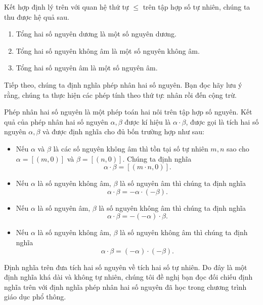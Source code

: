Kết hợp định lý trên với quan hệ thứ tự $\leq$ trên tập hợp số tự nhiên, chúng ta thu được hệ quả sau.

\begin{corollary}\label{corollary:positivity-negativity-nonnegativity-of-sum-of-integers}
	\begin{enumerate}[label={(\roman*)}]
		\item Tổng hai số nguyên dương là một số nguyên dương.
		\item Tổng hai số nguyên không âm là một số nguyên không âm.
		\item Tổng hai số nguyên âm là một số nguyên âm.
	\end{enumerate}
\end{corollary}

Tiếp theo, chúng ta định nghĩa phép nhân hai số nguyên. Bạn đọc hãy lưu ý rằng, chúng ta thực hiện các phép tính theo thứ tự: nhân rồi đến cộng trừ.
\begin{definition}
	Phép nhân hai số nguyên là một phép toán hai nôi trên tập hợp số nguyên. Kết quả của phép nhân hai số nguyên $\alpha, \beta$ được kí hiệu là $\alpha\cdot\beta$, được gọi là tích hai số nguyên $\alpha, \beta$ và được định nghĩa cho đủ bốn trường hợp như sau:
	\begin{itemize}[itemsep=0pt]
		\item Nếu $\alpha$ và $\beta$ là các số nguyên không âm thì tồn tại số tự nhiên $m, n$ sao cho $\alpha = [(m, 0)]$ và $\beta = [(n, 0)]$. Chúng ta định nghĩa
		      \[
			      \alpha\cdot\beta = [(m\cdot n, 0)].
		      \]
		\item Nếu $\alpha$ là số nguyên không âm, $\beta$ là số nguyên âm thì chúng ta định nghĩa
		      \[
			      \alpha\cdot\beta = -\alpha\cdot(-\beta).
		      \]
		\item Nếu $\alpha$ là số nguyên âm, $\beta$ là số nguyên không âm thì chúng ta định nghĩa
		      \[
			      \alpha\cdot\beta = -(-\alpha)\cdot \beta.
		      \]
		\item Nếu $\alpha$ là số nguyên không âm, $\beta$ là số nguyên không âm thì chúng ta định nghĩa
		      \[
			      \alpha\cdot\beta = (-\alpha)\cdot(-\beta).
		      \]
	\end{itemize}
\end{definition}

Định nghĩa trên đưa tích hai số nguyên về tích hai số tự nhiên. Do đây là một định nghĩa khá dài và không tự nhiên, chúng tôi đề nghị bạn đọc đối chiếu định nghĩa trên với định nghĩa phép nhân hai số nguyên đã học trong chương trình giáo dục phổ thông.

